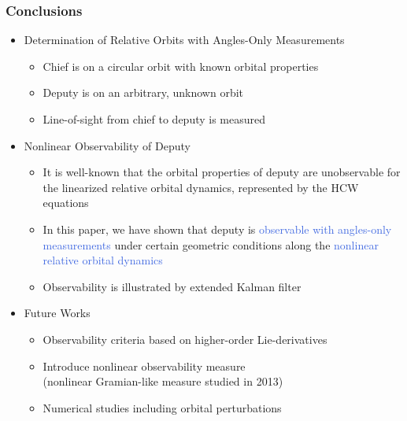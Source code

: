 \documentclass[hyperref={pdftex,pdfpagemode=none,pdfstartview=FitH},10pt]{beamer}
\def\Emph{\textcolor{RoyalBlue}}
\begin{document}
\begin{frame}
\frametitle{Conclusions}

\begin{itemize}
\item Determination of Relative Orbits with Angles-Only Measurements
	\begin{itemize}
	\item Chief is on a circular orbit with known orbital properties
	\item Deputy is on an arbitrary, unknown orbit
	\item Line-of-sight from chief to deputy is measured
	\end{itemize}
	\vspace*{0.3cm}\pause
\item Nonlinear Observability of Deputy
	\begin{itemize}
	\item It is well-known that the orbital properties of deputy are unobservable for the linearized relative orbital dynamics, represented by the HCW equations
	\item In this paper, we have shown that deputy is \Emph{observable with angles-only measurements} under certain geometric conditions along the \Emph{nonlinear relative orbital dynamics}
	\item Observability is illustrated by extended Kalman filter
	\end{itemize}
	\vspace*{0.3cm}\pause
\item Future Works
	\begin{itemize}
	\item Observability criteria based on higher-order Lie-derivatives
	\item Introduce nonlinear observability measure\\
	(nonlinear Gramian-like measure studied in 2013)
	\item Numerical studies including orbital perturbations
	\end{itemize}
\end{itemize}
\end{frame}
\end{document}
